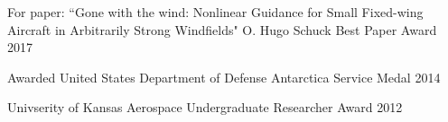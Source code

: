 
\begin{cvhonors}
  \cvhonor
    {For paper: ``Gone with the wind: Nonlinear Guidance for Small Fixed-wing Aircraft in Arbitrarily Strong Windfields"} %
    {O. Hugo Schuck Best Paper Award \quad{}} %
    {} %
    {2017} %

  \cvhonor
    {} %
    {Awarded United States Department of Defense Antarctica Service Medal} %
    {} %
    {2014} %

%

  \cvhonor
    {} %
    {Univserity of Kansas Aerospace Undergraduate Researcher Award} %
    {} %
    {2012} %

\end{cvhonors}
